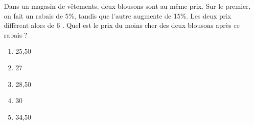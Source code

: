 Dans un magasin de vêtements, deux blousons sont au même prix. Sur le premier, on fait un rabais de 5\%, tandis que l'autre augmente de 15\%. Les deux prix diffèrent alors de 6 . Quel est le prix du moins cher des deux blousons après ce rabais ?
\begin{multicols}{5}
  \begin{enumerate}[A/]
  \item 25,50
  \item 27
  \item 28,50
  \item 30
  \item 34,50 
  \end{enumerate}
\end{multicols}